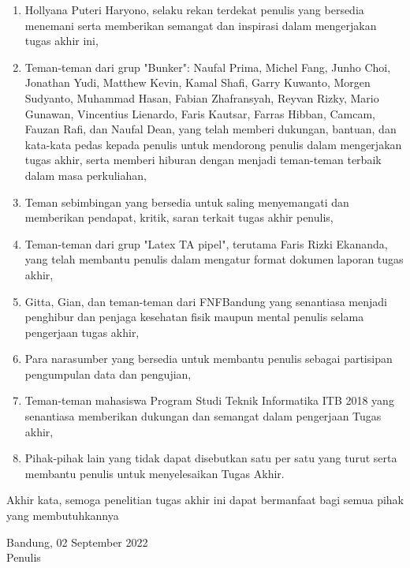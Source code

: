 \begin{enumerate}
  \item Hollyana Puteri Haryono, selaku rekan terdekat penulis yang bersedia menemani serta memberikan semangat dan inspirasi dalam mengerjakan tugas akhir ini,
  
  
  \item Teman-teman dari grup "Bunker": Naufal Prima, Michel Fang, Junho Choi, Jonathan Yudi, Matthew Kevin, Kamal Shafi, Garry Kuwanto, Morgen Sudyanto, Muhammad Hasan, Fabian Zhafransyah, Reyvan Rizky, Mario Gunawan, Vincentius Lienardo, Faris Kautsar, Farras Hibban, Camcam, Fauzan Rafi, dan Naufal Dean, yang telah memberi dukungan, bantuan, dan kata-kata pedas kepada penulis untuk mendorong penulis dalam mengerjakan tugas akhir, serta memberi hiburan dengan menjadi teman-teman terbaik dalam masa perkuliahan,
  
  \item Teman sebimbingan yang bersedia untuk saling menyemangati dan memberikan pendapat, kritik, saran terkait tugas akhir penulis,
  
  \item Teman-teman dari grup "Latex TA pipel", terutama Faris Rizki Ekananda, yang telah membantu penulis dalam mengatur format dokumen laporan tugas akhir,
  
  \item Gitta, Gian, dan teman-teman dari FNFBandung yang senantiasa menjadi penghibur dan penjaga kesehatan fisik maupun mental penulis selama pengerjaan tugas akhir,
  
  \item Para narasumber yang bersedia untuk membantu penulis sebagai partisipan pengumpulan data dan pengujian,

  \item Teman-teman mahasiswa Program Studi Teknik Informatika ITB 2018 yang senantiasa memberikan dukungan dan semangat dalam pengerjaan Tugas akhir,
   
  \item Pihak-pihak lain yang tidak dapat disebutkan satu per satu yang turut serta membantu penulis untuk menyelesaikan Tugas Akhir.
   
\end{enumerate}

Akhir kata, semoga penelitian tugas akhir ini dapat bermanfaat bagi semua pihak yang membutuhkannya

\vspace{1mm}

\begin{flushright}
  Bandung, 02 September 2022 \\
  \vspace{2.5cm}
  Penulis
\end{flushright}
\vfill
